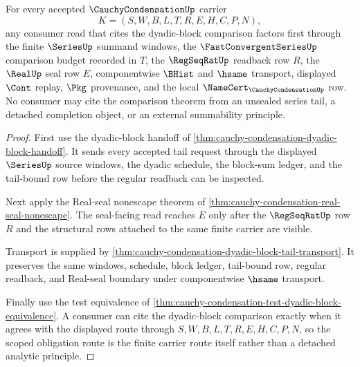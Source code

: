 \begin{theorem}
\label{thm:cauchy-condensation-scoped-obligation-route}
For every accepted $\CauchyCondensationUp$ carrier
$$
K=(S,W,B,L,T,R,E,H,C,P,N),
$$
any consumer read that cites the dyadic-block comparison factors first through the finite $\SeriesUp$ summand windows, the $\FastConvergentSeriesUp$ comparison budget recorded in $T$, the $\RegSeqRatUp$ readback row $R$, the $\RealUp$ seal row $E$, componentwise $\BHist$ and $\hsame$ transport, displayed $\Cont$ replay, $\Pkg$ provenance, and the local $\NameCert_{\CauchyCondensationUp}$ row. No consumer may cite the comparison theorem from an unsealed series tail, a detached completion object, or an external summability principle.
\end{theorem}
\begin{proof}
First use the dyadic-block handoff of \autoref{thm:cauchy-condensation-dyadic-block-handoff}. It sends every accepted tail request through the displayed $\SeriesUp$ source windows, the dyadic schedule, the block-sum ledger, and the tail-bound row before the regular readback can be inspected.

Next apply the Real-seal nonescape theorem of \autoref{thm:cauchy-condensation-real-seal-nonescape}. The seal-facing read reaches $E$ only after the $\RegSeqRatUp$ row $R$ and the structural rows attached to the same finite carrier are visible.

Transport is supplied by \autoref{thm:cauchy-condensation-dyadic-block-tail-transport}. It preserves the same windows, schedule, block ledger, tail-bound row, regular readback, and Real-seal boundary under componentwise $\hsame$ transport.

Finally use the test equivalence of \autoref{thm:cauchy-condensation-test-dyadic-block-equivalence}. A consumer can cite the dyadic-block comparison exactly when it agrees with the displayed route through $S,W,B,L,T,R,E,H,C,P,N$, so the scoped obligation route is the finite carrier route itself rather than a detached analytic principle.
\end{proof}

